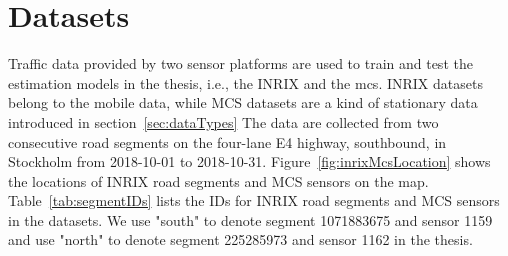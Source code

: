 \documentclass[english]{kththesis}
\begin{document}
\section{Datasets}
\label{sec:datasets}
Traffic data provided by two sensor platforms are used to train and test the estimation models in the thesis, i.e., the INRIX and the \gls{mcs}. INRIX datasets belong to the mobile data, while MCS datasets are a kind of stationary data introduced in section~\ref{sec:dataTypes} The data are collected from two consecutive road segments on the four-lane E4 highway, southbound, in Stockholm from 2018-10-01 to 2018-10-31. Figure~\ref{fig:inrixMcsLocation} shows the locations of INRIX road segments and MCS sensors on the map. Table~\ref{tab:segmentIDs} lists the IDs for INRIX road segments and MCS sensors in the datasets. We use "south" to denote segment 1071883675 and sensor 1159 and use "north" to denote segment 225285973 and sensor 1162 in the thesis.
\end{document}

